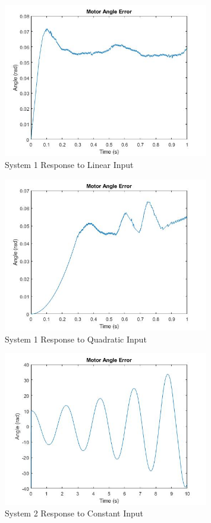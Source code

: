 \begin{figure}[H]
        \centering
        \includegraphics[width=0.8\textwidth]{./figures/lab4_fig8-part4-3-3-error-rc5-linear.jpg}
        \caption{System 1 Response to Linear Input}
        \label{fig:system1_linear}
\end{figure}

\begin{figure}[H]
        \centering
        \includegraphics[width=0.8\textwidth]{./figures/lab4_fig9-part4-3-3-error-rc5-quadratic.jpg}
        \caption{System 1 Response to Quadratic Input}
        \label{fig:system1_quadratic}
\end{figure}

\begin{figure}[H]
        \centering
        \includegraphics[width=0.8\textwidth]{./figures/lab4_fig10-part4-3-3-error-rc-I=1-constant.jpg}
        \caption{System 2 Response to Constant Input}
        \label{fig:system2_constant}
\end{figure}

